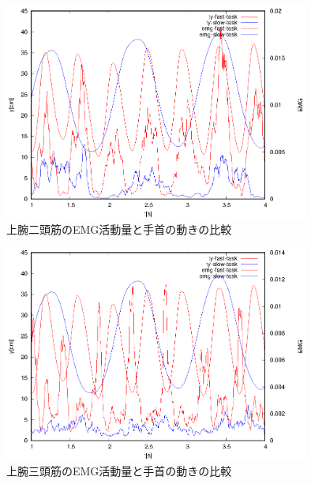 \documentclass{jsarticle}
\begin{document}
\begin{figure}[htb]
\begin{center}
\includegraphics[width=10cm]{hikakudata1.eps}
\caption{上腕二頭筋のEMG活動量と手首の動きの比較}
\label{hikaku1}
\end{center}
\end{figure}

\begin{figure}[htb]
\begin{center}
\includegraphics[width=10cm]{hikakudata2.eps}
\caption{上腕三頭筋のEMG活動量と手首の動きの比較}
\label{hikaku2}
\end{center}
\end{figure}
\end{document}
